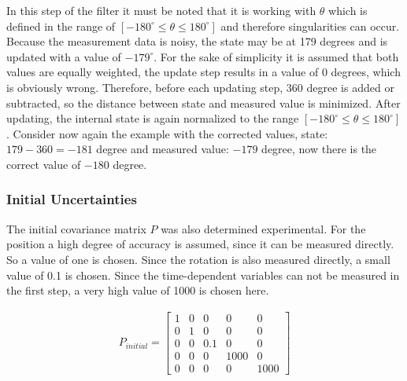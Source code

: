 \documentclass[11pt,oneside,openright]{mpreport}
\begin{document}
In this step of the filter it must be noted that it is working with $\theta$ which is defined in the range of $ [- 180^{\circ} \le \theta \le 180^{\circ}] $ and therefore singularities can occur.
Because the measurement data is noisy, the state may be at 179 degrees and is updated with a value of $ -179^{\circ} $. For the sake of simplicity it is assumed that both values are equally weighted,
the update step results in a value of 0 degrees, which is obviously wrong. Therefore, before each updating step, $ 360 $ degree is added or subtracted,
so the distance between state and measured value is minimized. After updating, the internal state is again normalized to the range $ [- 180^{\circ} \le \theta \le 180^{\circ}] $.
Consider now again the example with the corrected values, state: $ 179-360 = -181 $ degree and measured value: $ -179 $ degree, now there is the correct value of $ -180 $ degree.


\subsubsection{Initial Uncertainties}

The initial covariance matrix $ P $ was also determined experimental. For the position a high degree of accuracy is assumed, since it can be measured directly.
So a value of one is chosen. Since the rotation is also measured directly, a small value of 0.1 is chosen. Since the time-dependent variables can not be measured in the first step,
a very high value of 1000 is chosen here.

\begin{align*}
P_{initial}=
\begin{bmatrix}
1 & 0 & 0 & 0 & 0\\
0 & 1 & 0 & 0 & 0\\
0 & 0 & 0.1 & 0 & 0\\
0 & 0 & 0 & 1000 & 0\\
0 & 0 & 0 & 0 & 1000
\end{bmatrix} 
\end{align*}
\end{document}
